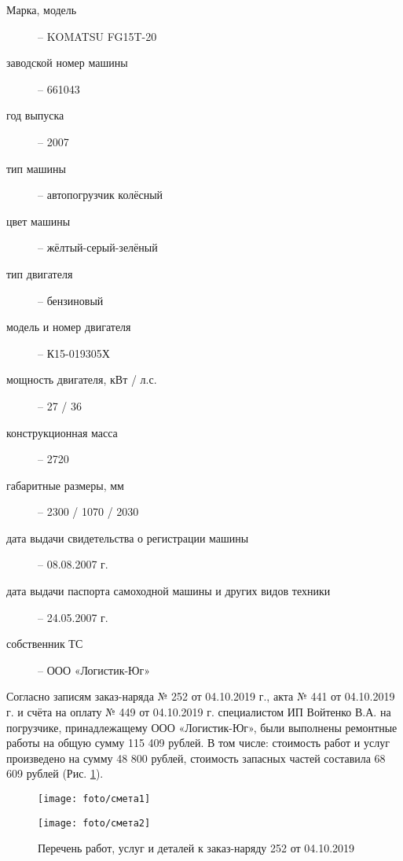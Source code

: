\begin{description}
%		
	\item[Марка, модель] -- KOMATSU FG15T-20
    \item[заводской номер машины] -- 661043
	\item[год выпуска ] -- 2007
	\item[тип машины] -- автопогрузчик колёсный
	\item[цвет машины] --  жёлтый-серый-зелёный
    \item[тип двигателя] -- бензиновый
    \item[модель и номер двигателя] -- К15-019305Х
    \item[мощность двигателя, кВт / л.с.] -- 27 / 36
    \item[конструкционная масса] -- 2720
    \item[габаритные размеры, мм] --  2300 / 1070 / 2030
    \item[дата выдачи свидетельства о регистрации машины] -- 08.08.2007 г.
    \item[дата выдачи паспорта самоходной машины и других видов техники] -- 24.05.2007 г.
    \item[собственник ТС ] -- ООО «Логистик-Юг» 
    \end{description}
\vspace{2mm}


\vspace{3mm}
\par Согласно  записям  заказ-наряда № 252 от 04.10.2019 г.,  акта № 441 от 04.10.2019 г. и счёта на оплату № 449 от 04.10.2019 г.  специалистом ИП Войтенко В.А. на погрузчике, принадлежащему ООО «Логистик-Юг», были выполнены ремонтные работы  на общую сумму 115 409 рублей. В том числе: стоимость работ и услуг произведено на сумму 48 800 рублей, стоимость запасных частей составила 68 609 рублей (Рис. \ref{переченьдеталей}).    

\vspace{7mm}
\begin{figure}[H]
    \centering
    \texttt{[image: foto/смета1]}
\end{figure}
\begin{figure}[H]
    \centering
    \texttt{[image: foto/смета2]}
        \caption{Перечень работ, услуг и деталей к заказ-наряду 252 от 04.10.2019}
       {\footnotesize\label{переченьдеталей}}
\end{figure}

